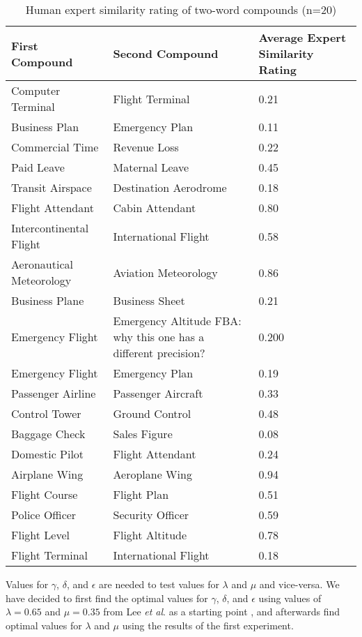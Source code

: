 \documentclass{article}
\newcommand\fba[1]{\textcolor{SeaGreen3}{FBA: #1}}
\begin{document}
\begin{table}[h!]
\caption{Human expert similarity rating of two-word compounds (n=20)}
\centering
\begin{tabular}{lll}
	\toprule
	First Compound & Second Compound & Average Expert Similarity Rating \\
	\midrule
	Computer Terminal & Flight Terminal & 0.21 \\
	Business Plan & Emergency Plan & 0.11 \\
	Commercial Time & Revenue Loss & 0.22 \\
	Paid Leave & Maternal Leave & 0.45 \\
	Transit Airspace & Destination Aerodrome & 0.18 \\
	Flight Attendant & Cabin Attendant & 0.80 \\
	Intercontinental Flight & International Flight & 0.58 \\
	Aeronautical Meteorology & Aviation Meteorology & 0.86 \\
	Business Plane & Business Sheet & 0.21 \\
	Emergency Flight & Emergency Altitude \fba{why this one has a different precision?} & 0.200 \\
	Emergency Flight & Emergency Plan & 0.19 \\
	Passenger Airline & Passenger Aircraft & 0.33 \\
	Control Tower & Ground Control & 0.48 \\
	Baggage Check & Sales Figure & 0.08 \\
	Domestic Pilot & Flight Attendant & 0.24 \\
	Airplane Wing & Aeroplane Wing & 0.94 \\
	Flight Course & Flight Plan & 0.51 \\
	Police Officer & Security Officer & 0.59 \\
	Flight Level & Flight Altitude & 0.78 \\
	Flight Terminal & International Flight & 0.18 \\
	\bottomrule
\end{tabular}
\label{table:humancompoundsimilarity}
\end{table}

Values for $\gamma$, $\delta$, and $\epsilon$ are needed to test values for $\lambda$ and $\mu$ and vice-versa. We have decided to first find the optimal values for $\gamma$, $\delta$, and $\epsilon$ using values of $\lambda = 0.65$ and $\mu = 0.35$ from Lee \emph{et al}. as a starting point \cite{lee2016combining}, and afterwards find optimal values for $\lambda$ and $\mu$ using the results of the first experiment.
\end{document}

